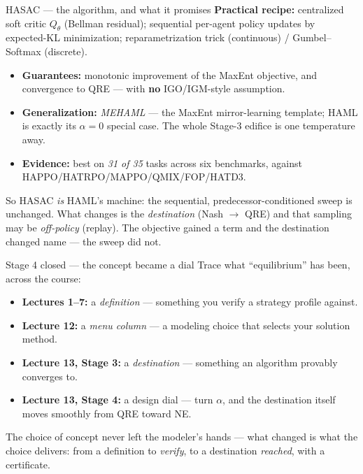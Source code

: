 \documentclass[10pt, aspectratio=169]{beamer}
\begin{document}
\begin{frame}{HASAC --- the algorithm, and what it promises}
\textbf{Practical recipe:} centralized soft critic $Q_\theta$ (Bellman residual); sequential per-agent policy updates by expected-KL minimization; reparametrization trick (continuous) / Gumbel--Softmax (discrete).
\medskip

\begin{itemize}\setlength\itemsep{2pt}
\item \textbf{Guarantees:} monotonic improvement of the MaxEnt objective, and convergence to \alert{QRE} --- with \textbf{no} IGO/IGM-style assumption.
\item \textbf{Generalization:} \emph{MEHAML} --- the MaxEnt mirror-learning template; \alert{HAML is exactly its $\alpha=0$ special case}. The whole Stage-3 edifice is one temperature away.
\item \textbf{Evidence:} best on \emph{31 of 35} tasks across six benchmarks, against HAPPO/HATRPO/MAPPO/QMIX/FOP/HATD3.
\end{itemize}
\medskip
\pause
{\footnotesize\textcolor{mLightBrown}{So HASAC \emph{is} HAML's machine: the \alert{sequential, predecessor-conditioned sweep is unchanged}. What changes is the \emph{destination} (Nash $\to$ QRE) and that sampling may be \emph{off-policy} (replay). The objective gained a term and the destination changed name --- the sweep did not.}}
\end{frame}

\begin{frame}{Stage 4 closed --- the concept became a dial}
Trace what ``equilibrium'' has been, across the course:
\begin{itemize}\setlength\itemsep{3pt}
\item \textbf{Lectures 1--7:} a \emph{definition} --- something you verify a strategy profile against.
\item \textbf{Lecture 12:} a \emph{menu column} --- a modeling choice that selects your solution method.
\item \textbf{Lecture 13, Stage 3:} a \emph{destination} --- something an algorithm provably converges to.
\item \textbf{Lecture 13, Stage 4:} a \alert{design dial} --- turn $\alpha$, and the destination itself moves smoothly from QRE toward NE.
\end{itemize}
\medskip
\pause
\begin{center}\large
The choice of concept never left the modeler's hands --- what changed is \alert{what the choice delivers}: from a definition to \emph{verify}, to a destination \emph{reached}, with a certificate.
\end{center}
\end{frame}
\end{document}
